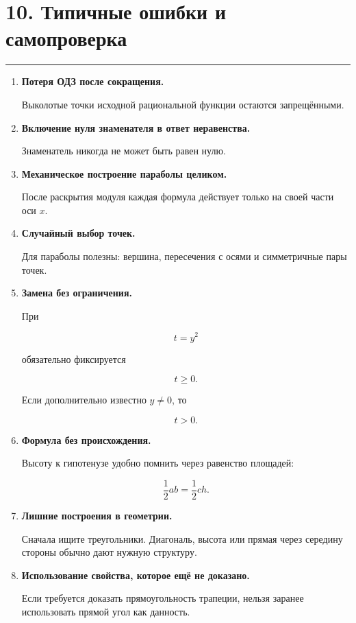 \documentclass[a4paper,12pt]{article}
\newcommand{\topicline}{
    \textcolor{accent}{\rule{\linewidth}{0.6pt}}
}
\begin{document}
\clearpage


\section*{10. Типичные ошибки и самопроверка}
\topicline

\begin{enumerate}

    \item
    \textbf{Потеря ОДЗ после сокращения.}

    Выколотые точки исходной рациональной функции
    остаются запрещёнными.

    \item
    \textbf{Включение нуля знаменателя
    в ответ неравенства.}

    Знаменатель никогда не может быть равен нулю.

    \item
    \textbf{Механическое построение параболы целиком.}

    После раскрытия модуля каждая формула действует
    только на своей части оси $x$.

    \item
    \textbf{Случайный выбор точек.}

    Для параболы полезны:
    вершина,
    пересечения с осями
    и симметричные пары точек.

    \item
    \textbf{Замена без ограничения.}

    При

    \[
    t=y^2
    \]

    обязательно фиксируется

    \[
    t\ge0.
    \]

    Если дополнительно известно $y\ne0$,
    то

    \[
    t>0.
    \]

    \item
    \textbf{Формула без происхождения.}

    Высоту к гипотенузе удобно помнить
    через равенство площадей:

    \[
    \frac12ab
    =
    \frac12ch.
    \]

    \item
    \textbf{Лишние построения в геометрии.}

    Сначала ищите треугольники.
    Диагональ, высота или прямая через середину стороны
    обычно дают нужную структуру.

    \item
    \textbf{Использование свойства,
    которое ещё не доказано.}

    Если требуется доказать прямоугольность трапеции,
    нельзя заранее использовать прямой угол как данность.

\end{enumerate}
\end{document}
